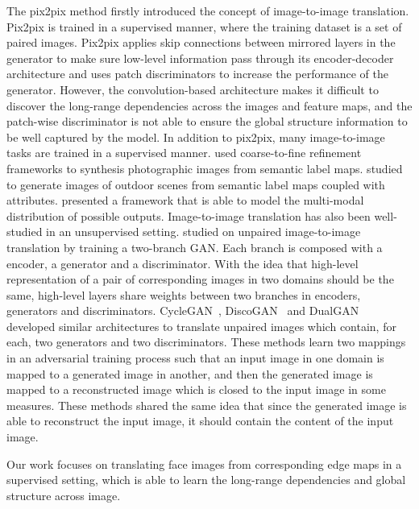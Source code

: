 The pix2pix method \cite{pix2pix} firstly introduced the concept of image-to-image translation. Pix2pix is trained in a supervised manner, where the training dataset is a set of paired images. 
Pix2pix applies skip connections \cite{Unet} between mirrored layers in the generator to make sure low-level information pass through its encoder-decoder architecture and uses patch discriminators to increase the performance of the generator. However, the convolution-based architecture makes it difficult to discover the long-range dependencies across the images and feature maps, and the patch-wise discriminator is not able to ensure the global structure information to be well captured by the model.
%
In addition to pix2pix, many image-to-image tasks are trained in a supervised manner. 
\cite{CRN, pix2pixHD} used coarse-to-fine refinement frameworks to synthesis photographic images from semantic label maps. 
\cite{outdoor_scene} studied to generate images of outdoor scenes from semantic label maps coupled with attributes.
\cite{BicycleGANs} presented a framework that is able to model the multi-modal distribution of possible outputs.
%
%
Image-to-image translation has also been well-studied in an unsupervised setting.
\cite{UNIT} studied on unpaired image-to-image translation by training a two-branch GAN. Each branch is composed with a encoder, a generator and a discriminator. With the idea that high-level representation of a pair of corresponding images in two domains should be the same, high-level layers share weights between two branches in encoders, generators and discriminators. 
%
CycleGAN~\cite{CycleGANs}, DiscoGAN~\cite{DiscoGANs} and DualGAN~\cite{DualGANs} developed similar architectures to translate unpaired images which contain, for each, two generators and two discriminators. These methods learn two mappings in an adversarial training process such that an input image in one domain is mapped to a generated image in another, and then the generated image is mapped to a reconstructed image which is closed to the input image in some measures. These methods shared the same idea that since the generated image is able to reconstruct the input image, it should contain the content of the input image. 

Our work focuses on translating face images from corresponding edge maps in a supervised setting, which is able to learn the long-range dependencies and global structure across image.

